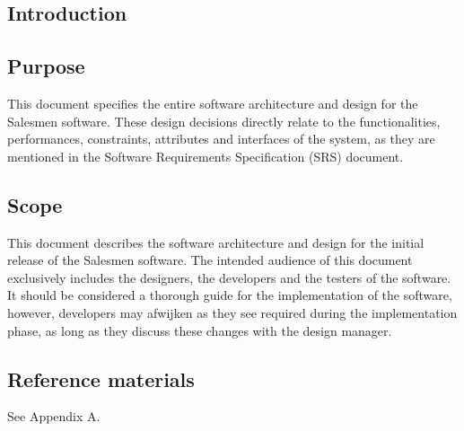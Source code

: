 \documentclass[salesmen, twoside]{../../../templates/latex/2009/softproj}
\begin{document}
\begin{projdoc}

\chapter{Introduction}

\section{Purpose}
This document specifies the entire software architecture and design for the Salesmen software. These design decisions directly relate to the functionalities, performances, constraints, attributes and interfaces of the system, as they are mentioned in the Software Requirements Specification (SRS) document.

\section{Scope}
This document describes the software architecture and design for the initial release of the Salesmen software. The intended audience of this document exclusively includes the designers, the developers and the testers of the software.\\
It should be considered a thorough guide for the implementation of the software, however, developers may afwijken as they see required during the implementation phase, as long as they discuss these changes with the design manager.

\section{Reference materials}
See Appendix A.


\end{projdoc}
\end{document}
